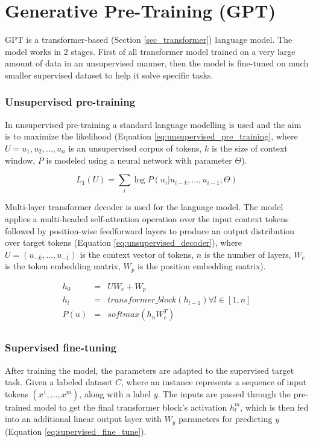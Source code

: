 \section{Generative Pre-Training (GPT)} \label{sec_gpt}
GPT \cite{radford2018improving} is a transformer-based (Section \ref{sec_transformer}) language model. The model works in 2 stages. First of all transformer model trained on a very large amount of data in an unsupervised manner, then the model is fine-tuned on much smaller supervised dataset to help it solve specific tasks.

\subsubsection{Unsupervised pre-training}
In unsupervised pre-training a standard language modelling is used and the aim is to maximize the likelihood (Equation \ref{eq:unsupervised_pre_training}, where $U = {u_1, u_2, ... , u_n}$ is an unsupervised corpus of tokens, $k$ is the size of context window, $P$ is modeled using a neural network with parameter $\Theta$).

\begin{equation} \label{eq:unsupervised_pre_training}
L_1(U) = \sum_i \log P(u_i|u_{i-k}, ... , u_{i-1}; \Theta)
\end{equation}

Multi-layer transformer decoder is used for the language model. The model applies a multi-headed self-attention operation over the input context tokens followed by position-wise feedforward layers to produce an output distribution
over target tokens (Equation \ref{eq:unsupervised_decoder}), where $U = (u_{-k}, ... , u_{-1})$ is the context vector of tokens, $n$ is the number of layers, $W_e$ is the token embedding matrix, $W_p$ is the position embedding matrix).

\begin{equation}  \label{eq:unsupervised_decoder}
\begin{array}{lcl} 
h_0 & = &UW_e + W_p \\

h_l & = & transformer\_block(h_{l-1}) \forall l \in [1,n] \\

P(u) & = & softmax(h_n W_e^T) \\
\end{array}
\end{equation}

\subsubsection{Supervised fine-tuning}
After training the model, the parameters are adapted to the supervised target task. Given a labeled dataset $C$, where an instance represents a sequence of input tokens $(x^1, ... , x^m)$, along with a label $y$. The inputs are passed through the pre-trained model to get the final transformer block's activation $h_l^m$, which is then fed into an additional linear output layer with $W_y$ parameters for predicting $y$ (Equation \ref{eq:supervised_fine_tune}). 

